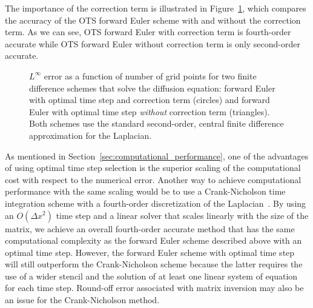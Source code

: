 \documentclass[fleqn,12pt,twoside]{article}
\def\dx{\Delta x}
\begin{document}
The importance of the correction term is illustrated in 
Figure~\ref{fig:diffusion_eqn_1d_src_error}, which compares the accuracy of 
the OTS forward Euler scheme with and without the correction term.  As we 
can see, OTS forward Euler with correction term is fourth-order accurate 
while OTS forward Euler without correction term is only second-order 
accurate.  

\begin{figure}[tb]
\begin{center}
\caption{$L^\infty$ error as a function of number of grid points for 
two finite difference schemes that solve the diffusion equation: 
forward Euler with optimal time step and correction term (circles) and 
forward Euler with optimal time step \emph{without} correction term 
(triangles).  Both schemes use the standard second-order, central finite 
difference approximation for the Laplacian.
}
\label{fig:diffusion_eqn_1d_src_error}
\end{center}
\end{figure}

As mentioned in Section~\ref{sec:computational_performance}, one of the 
advantages of using optimal time step selection is the superior scaling of 
the computational cost with respect to the numerical error.  
Another way to achieve computational performance with the same scaling would 
be to use a Crank-Nicholson time integration scheme with a fourth-order 
discretization of the Laplacian~\cite{gibou_2005}.  By using an 
$O\left(\dx^2 \right)$ time step and a linear solver that scales linearly 
with the size of the matrix, we achieve an overall fourth-order accurate 
method that has the same computational complexity as the forward Euler scheme
described above with an optimal time step.  However, the forward Euler scheme 
with optimal time step will still outperform the Crank-Nicholson scheme 
because the latter requires the use of a wider stencil and the solution of 
at least one linear system of equation for each time step.  Round-off error
associated with matrix inversion may also be an issue for the Crank-Nicholson 
method.
\end{document}
